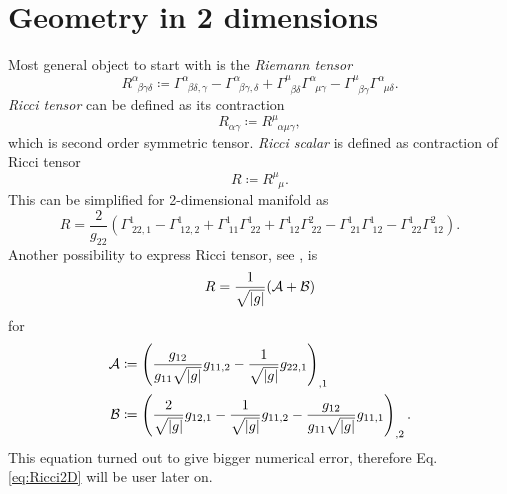 \section{Geometry in 2 dimensions}
Most general object to start with is the \emph{Riemann tensor}
\begin{equation}
    R^\alpha_{\;\;\beta\gamma\delta}\coloneqq \Gamma^\alpha_{\;\;\beta\delta,\gamma}-\Gamma^\alpha_{\;\;\beta\gamma,\delta}+\Gamma^\mu_{\;\;\beta\delta}\Gamma^\alpha_{\;\;\mu\gamma}-\Gamma^\mu_{\;\;\beta\gamma}\Gamma^\alpha_{\;\;\mu\delta}.
\end{equation}
\emph{Ricci tensor} can be defined as its contraction 
\begin{equation}
    R_{\alpha\gamma}\coloneqq R^\mu_{\;\;\alpha\mu\gamma},
\end{equation}
which is second order symmetric tensor.
\emph{Ricci scalar} is defined as contraction of Ricci tensor
\begin{equation}
    R\coloneqq R^\mu_{\;\;\mu}.
\end{equation}
This can be simplified for 2-dimensional manifold as
\begin{equation}
    R=\frac{2}{g_{22}}\left(\Gamma^1_{\;22,1}-\Gamma^1_{\;12,2}+\Gamma^1_{\;11}\Gamma^1_{\;22}+\Gamma^1_{\;12}\Gamma^2_{\;22}-\Gamma^1_{\;21}\Gamma^1_{\;12}-\Gamma^1_{\;22}\Gamma^2_{\;12}\right).
    \label{eq:Ricci2D}
\end{equation}
Another possibility to express Ricci tensor, see \citet[eq. 6,7]{geometricTensorLipkin}, is
\begin{equation}
    R=\frac{1}{\sqrt{\left|{g}\right|}}(\mathcal{A}+\mathcal{B})
\end{equation}
for
\begin{align}
    \mathcal{A}&\coloneqq \left(\frac{g_{12}}{g_{11}\sqrt{\left|{g}\right|}}g_{11,2}-\frac{1}{\sqrt{\left|{g}\right|}}g_{22,1}\right)_{,1}\\
    \mathcal{B}&\coloneqq \left(\frac{2}{\sqrt{\left|{g}\right|}}g_{12,1}-\frac{1}{\sqrt{\left|{g}\right|}}g_{11,2}-\frac{g_{12}}{g_{11}\sqrt{\left|{g}\right|}}g_{11,1}\right)_{,2}.
\end{align}
This equation turned out to give bigger numerical error, therefore Eq. \ref{eq:Ricci2D} will be user later on.

